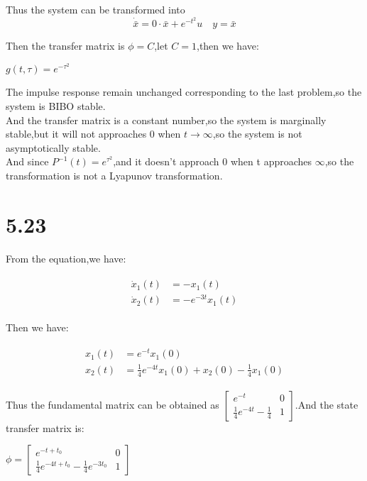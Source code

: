 \documentclass{article}
\begin{document}
Thus the system can be transformed into\\
$$
\dot{\bar{x}}=0 \cdot \bar{x}+e^{-t^{2}} u \quad y=\bar{x}
$$

Then the transfer matrix is $\phi=C$,let $C=1$,then we have:\\
\begin{center}
    $g(t,\tau)=e^{-\tau^2}$
\end{center}

The impulse response remain unchanged corresponding to the last problem,so the system is BIBO stable.\\

And the transfer matrix is a constant number,so the system is marginally stable,but it will not approaches 0 when $t\rightarrow \infty$,so the system is not asymptotically stable.\\

And since $P^{-1}(t)=e^{\tau^2}$,and it doesn't approach 0 when t approaches $\infty$,so the transformation is not a Lyapunov transformation.

\section*{5.23}

From the equation,we have:\\
\begin{center}
    \begin{eqnarray*}\begin{split}
    \dot{x}_1(t)&=-x_1(t)\\
    \dot{x}_2(t)&=-e^{-3t}x_1(t)
    \end{split}\end{eqnarray*}
\end{center}

Then we have:\\
\begin{center}
    \begin{eqnarray*}\begin{split}
    x_1(t)&=e^{-t}x_1(0)\\
    x_2(t)&=\frac{1}{4}e^{-4t}x_1(0)+x_2(0)-\frac{1}{4}x_1(0)
    \end{split}\end{eqnarray*}
\end{center}

Thus the fundamental matrix can be obtained as $\left[\begin{array}{ll} e^{-t} & 0\\ \frac{1}{4}e^{-4t}-\frac{1}{4} & 1\end{array}\right]$.And the state transfer matrix is:\\
\begin{center}
    $\phi=\left[\begin{array}{ll} e^{-t+t_0} & 0 \\ \frac{1}{4}e^{-4t+t_0}-\frac{1}{4}e^{-3t_0} & 1\end{array}\right]$
\end{center}
\end{document}
